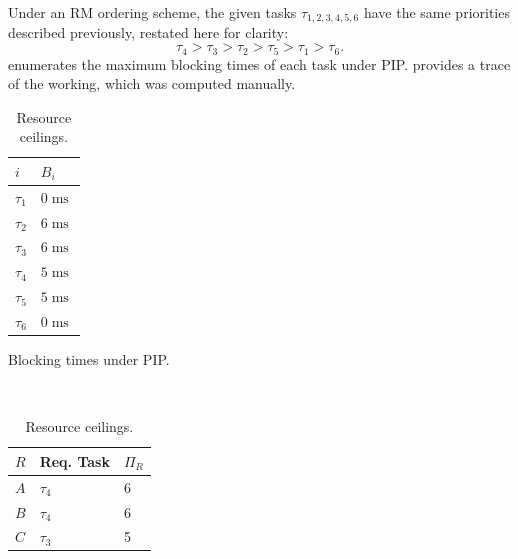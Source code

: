 \documentclass{article}
\numberwithin{equation}{section}
\numberwithin{table}{section}
\numberwithin{figure}{section}
\DeclareMathOperator\mls{ms}
\begin{document}
\begin{enumerate}
        Under an RM ordering scheme, the given tasks $\tau_{1,2,3,4,5,6}$ have
        the same priorities described previously, restated here for clarity:
        \begin{equation}
            \tau_4 > \tau_3 > \tau_2 > \tau_5 > \tau_1 > \tau_6.
        \end{equation}
         enumerates the maximum blocking times of each
        task under PIP.  provides a trace of the
        working, which was computed manually.
        \begin{table}
            \centering%
            \begin{subtable}{.33\linewidth}
                \centering%
                \begin{tabular}{ll}
                    $i$ & $B_i$ \\
                    \toprule
                    $\tau_1$ & $0\mls$ \\
                    $\tau_2$ & $6\mls$ \\
                    $\tau_3$ & $6\mls$ \\
                    $\tau_4$ & $5\mls$ \\
                    $\tau_5$ & $5\mls$ \\
                    $\tau_6$ & $0\mls$ \\
                    \bottomrule
                \end{tabular}
                \caption{Blocking times under PIP.}%
                \label{table:pip-blocking}
            \end{subtable}~%
            \begin{subtable}{.33\linewidth}
                \centering%
                \begin{tabular}{lll}
                    $R$ & Req. Task & $\Pi_R$ \\
                    \toprule
                    $A$ & $\tau_4$ & 6 \\
                    $B$ & $\tau_4$ & 6 \\
                    $C$ & $\tau_3$ & 5 \\
                    \bottomrule
                \end{tabular}
                \caption{Resource ceilings.}%
                \label{table:resource-ceilings}
            \end{subtable}~%
            \begin{subtable}{.33\linewidth}
                \centering%

\end{subtable}
\end{table}
\end{enumerate}
\end{document}
